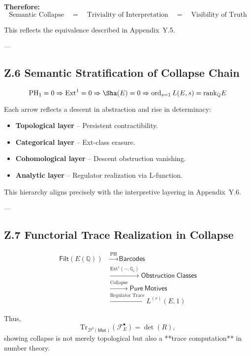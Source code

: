 \textbf{Therefore:}
\[
\text{Semantic Collapse} \quad = \quad \text{Triviality of Interpretation} \quad = \quad \text{Visibility of Truth}
\]

This reflects the equivalence described in Appendix~Y.5.

---

\subsection*{Z.6 Semantic Stratification of Collapse Chain}

\[
\mathrm{PH}_1 = 0 \Rightarrow \mathrm{Ext}^1 = 0 \Rightarrow \Sha(E) = 0 \Rightarrow \operatorname{ord}_{s=1} L(E,s) = \mathrm{rank}_\mathbb{Q} E
\]

Each arrow reflects a descent in abstraction and rise in determinacy:

\begin{itemize}
  \item \textbf{Topological layer} – Persistent contractibility.
  \item \textbf{Categorical layer} – Ext-class erasure.
  \item \textbf{Cohomological layer} – Descent obstruction vanishing.
  \item \textbf{Analytic layer} – Regulator realization via L-function.
\end{itemize}

This hierarchy aligns precisely with the interpretive layering in Appendix~Y.6.

---

\subsection*{Z.7 Functorial Trace Realization in Collapse}

\begin{align*}
\mathsf{Filt}(E(\mathbb{Q})) 
&\xrightarrow{\mathrm{PH}} \mathsf{Barcodes} \\
&\xrightarrow{\text{Ext}^1(-, \mathbb{Q}_\ell)} \mathsf{Obstruction~Classes} \\
&\xrightarrow{\text{Collapse}} \mathsf{Pure~Motives} \\
&\xrightarrow{\text{Regulator~Trace}} L^{(r)}(E,1)
\end{align*}

Thus,
\[
\mathrm{Tr}_{\mathcal{D}^b(\mathsf{Mot})}(\mathcal{F}_E^\bullet) = \det(R),
\]
showing collapse is not merely topological but also a **trace computation** in number theory.

